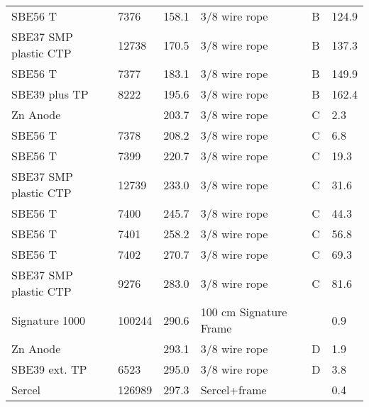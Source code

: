 \documentclass{article}
\begin{document}
\begin{table}[!htbp]
\begin{tabular}{llllll}
SBE56 T & 7376 & 158.1 & 3/8 wire rope & B & 124.9 \\
SBE37 SMP plastic CTP & 12738 & 170.5 & 3/8 wire rope & B & 137.3 \\
SBE56 T & 7377 & 183.1 & 3/8 wire rope & B & 149.9 \\
SBE39 plus TP & 8222 & 195.6 & 3/8 wire rope & B & 162.4 \\
Zn Anode &  & 203.7 & 3/8 wire rope & C & 2.3 \\
SBE56 T & 7378 & 208.2 & 3/8 wire rope & C & 6.8 \\
SBE56 T & 7399 & 220.7 & 3/8 wire rope & C & 19.3 \\
SBE37 SMP plastic CTP & 12739 & 233.0 & 3/8 wire rope & C & 31.6 \\
SBE56 T & 7400 & 245.7 & 3/8 wire rope & C & 44.3 \\
SBE56 T & 7401 & 258.2 & 3/8 wire rope & C & 56.8 \\
SBE56 T & 7402 & 270.7 & 3/8 wire rope & C & 69.3 \\
SBE37 SMP plastic CTP & 9276 & 283.0 & 3/8 wire rope & C & 81.6 \\
Signature 1000 & 100244 & 290.6 & 100 cm Signature Frame &  & 0.9 \\
Zn Anode &  & 293.1 & 3/8 wire rope & D & 1.9 \\
SBE39 ext. TP & 6523 & 295.0 & 3/8 wire rope & D & 3.8 \\
Sercel & 126989 & 297.3 & Sercel+frame &  & 0.4 \\
\bottomrule
\end{tabular}
\end{table}
\end{document}
